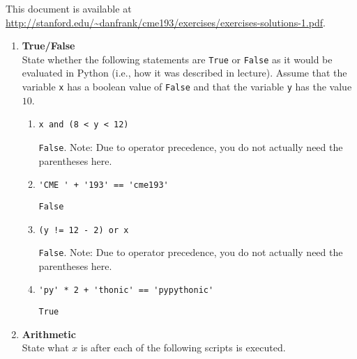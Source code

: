 \documentclass{article}
\begin{document}
\pagestyle{fancy}

This document is available at \url{http://stanford.edu/~danfrank/cme193/exercises/exercises-solutions-1.pdf}.


\begin{enumerate}
\item \textbf{True/False} \\
State whether the following statements are \texttt{True} or \texttt{False} as it would be evaluated in Python (i.e., how it was described in lecture).  Assume that the variable \texttt{x} has a boolean value of \texttt{False} and that the variable \texttt{y} has the value $10$.

\begin{enumerate}
\item
\begin{lstlisting}
x and (8 < y < 12)
\end{lstlisting}
\texttt{False}.  Note: Due to operator precedence, you do not actually need the parentheses here.
\end{enumerate}

\begin{enumerate}
\setcounter{enumii}{1}
\item 
\begin{lstlisting}
'CME ' + '193' == 'cme193'
\end{lstlisting}
\texttt{False}
\end{enumerate}

\begin{enumerate}
\setcounter{enumii}{2}
\item 
\begin{lstlisting}
(y != 12 - 2) or x
\end{lstlisting}
\texttt{False}.  Note: Due to operator precedence, you do not actually need the parentheses here.
\end{enumerate}

\begin{enumerate}
\setcounter{enumii}{3}
\item 
\begin{lstlisting}
'py' * 2 + 'thonic' == 'pypythonic'
\end{lstlisting}
\texttt{True}
\end{enumerate}

\item \textbf{Arithmetic} \\
State what $x$ is after each of the following scripts is executed.


\end{enumerate}
\end{document}
